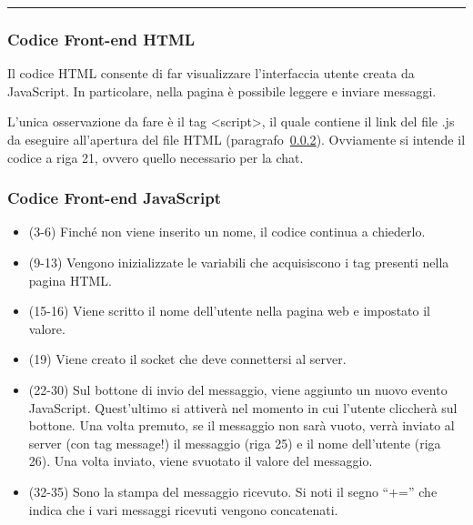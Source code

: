 \documentclass[a4paper]{article}
\newcommand{\longline}{\noindent\rule{\textwidth}{0.4pt}}
\newcommand{\dquotes}[1]{``#1''}
\begin{document}
	\longline
	
	\subsubsection{Codice Front-end HTML}
	
	
	Il codice HTML consente di far visualizzare l'interfaccia utente creata da JavaScript. In particolare, nella pagina è possibile leggere e inviare messaggi.\newline
	
	\noindent
	L'unica osservazione da fare è il tag \textsf{<script>}, il quale contiene il link del file .js da eseguire all'apertura del file HTML (paragrafo~\ref{codice Front-end JavaScript}). Ovviamente si intende il codice a riga 21, ovvero quello necessario per la chat.\newpage
	
	\subsubsection{Codice Front-end JavaScript}\label{codice Front-end JavaScript}
	
	
	\begin{itemize}
		\item (3-6) Finché non viene inserito un nome, il codice continua a chiederlo.
		
		\item (9-13) Vengono inizializzate le variabili che acquisiscono i tag presenti nella pagina HTML.
		
		\item (15-16) Viene scritto il nome dell'utente nella pagina web e impostato il valore.
		
		\item (19) Viene creato il socket che deve connettersi al server.
		
		\item (22-30) Sul bottone di invio del messaggio, viene aggiunto un nuovo evento JavaScript. Quest'ultimo si attiverà nel momento in cui l'utente cliccherà sul bottone. Una volta premuto, se il messaggio non sarà vuoto, verrà inviato al server (con tag \textsf{message}!) il messaggio (riga 25) e il nome dell'utente (riga 26). Una volta inviato, viene svuotato il valore del messaggio.
		
		\item (32-35) Sono la stampa del messaggio ricevuto. Si noti il segno \dquotes{+=} che indica che i vari messaggi ricevuti vengono concatenati.
	\end{itemize}\newpage
\end{document}
